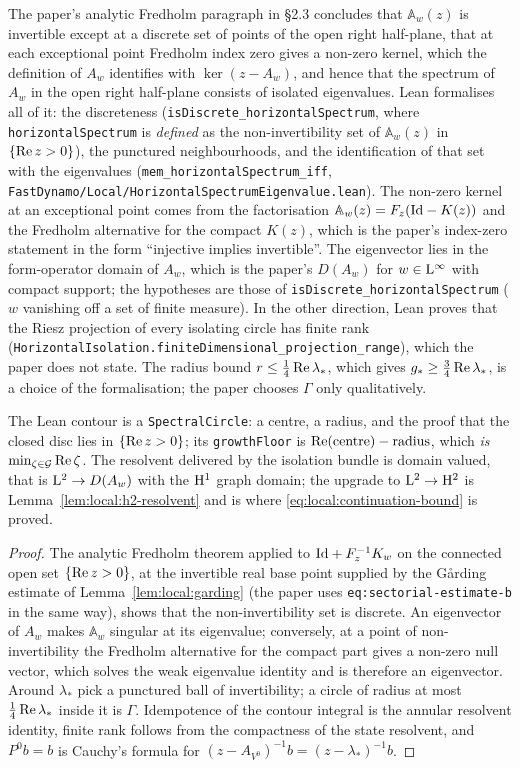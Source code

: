 The paper's analytic Fredholm paragraph in §2.3 concludes that $\mathbb A_w(z)$ is invertible
except at a discrete set of points of the open right half-plane, that at each exceptional point
Fredholm index zero gives a non-zero kernel, which the definition of $A_w$ identifies with
$\ker(z-A_w)$, and hence that the spectrum of $A_w$ in the open right half-plane consists of
isolated eigenvalues.  Lean formalises all of it: the discreteness
(\texttt{isDiscrete\_horizontalSpectrum}, where \texttt{horizontalSpectrum} is \emph{defined}
as the non-invertibility set of $\mathbb A_w(z)$ in $\{\operatorname{Re} z>0\}$), the punctured
neighbourhoods, and the identification of that set with the eigenvalues
(\texttt{mem\_horizontalSpectrum\_iff}, \texttt{FastDynamo/Local/HorizontalSpectrumEigenvalue.lean}).
The non-zero kernel at an exceptional point comes from the factorisation
$\mathbb A_w(z)=F_z(\mathrm{Id}-K(z))$ and the Fredholm alternative for the compact $K(z)$, which is
the paper's index-zero statement in the form ``injective implies invertible''.  The eigenvector
lies in the form-operator domain of $A_w$, which is the paper's $D(A_w)$ for $w\in\mathrm{L}^\infty$ with
compact support; the hypotheses are those of \texttt{isDiscrete\_horizontalSpectrum}
($w$ vanishing off a set of finite measure).  In the other direction, Lean proves that the
Riesz projection of every isolating circle has finite rank
(\texttt{HorizontalIsolation.finiteDimensional\_projection\_range}), which the paper does not
state.  The radius bound $r\leq\tfrac14\operatorname{Re}\lambda_*$, which gives
$g_*\geq\tfrac34\operatorname{Re}\lambda_*$, is a choice of the formalisation; the paper chooses $\Gamma$
only qualitatively.

The Lean contour is a \texttt{SpectralCircle}: a centre, a radius, and the proof that the
closed disc lies in $\{\operatorname{Re} z>0\}$; its \texttt{growthFloor} is
$\operatorname{Re}(\text{centre})-\text{radius}$, which \emph{is} $\min_{\zeta\in\mathcal{G}}\operatorname{Re}\zeta$.  The
resolvent delivered by the isolation bundle is domain valued, that is $\mathrm{L}^2\to D(A_w)$
with the $\mathrm{H}^1$ graph domain; the upgrade to $\mathrm{L}^2\to\mathrm{H}^2$ is
Lemma~\ref{lem:local:h2-resolvent} and is where \eqref{eq:local:continuation-bound} is
proved.

\begin{proof}
  \leanok
  The analytic Fredholm theorem applied to $\mathrm{Id}+F_z^{-1}K_w$ on the connected open set
  $\{\operatorname{Re} z>0\}$, at the invertible real base point supplied by the Gårding estimate of
  Lemma~\ref{lem:local:garding} (the paper uses \texttt{eq:sectorial-estimate-b} in the
  same way), shows that the non-invertibility set is discrete.  An eigenvector of $A_w$
  makes $\mathbb A_w$ singular at its eigenvalue; conversely, at a point of non-invertibility
  the Fredholm alternative for the compact part gives a non-zero null vector, which solves the
  weak eigenvalue identity and is therefore an eigenvector.  Around $\lambda_*$ pick a punctured ball
  of invertibility; a circle of radius at most $\tfrac14\operatorname{Re}\lambda_*$ inside it is $\Gamma$.
  Idempotence of the contour integral is the annular resolvent identity, finite rank
  follows from the compactness of the state resolvent, and $P^0b=b$ is Cauchy's formula
  for $(z-A_{V^0})^{-1}b=(z-\lambda_*)^{-1}b$.
\end{proof}

